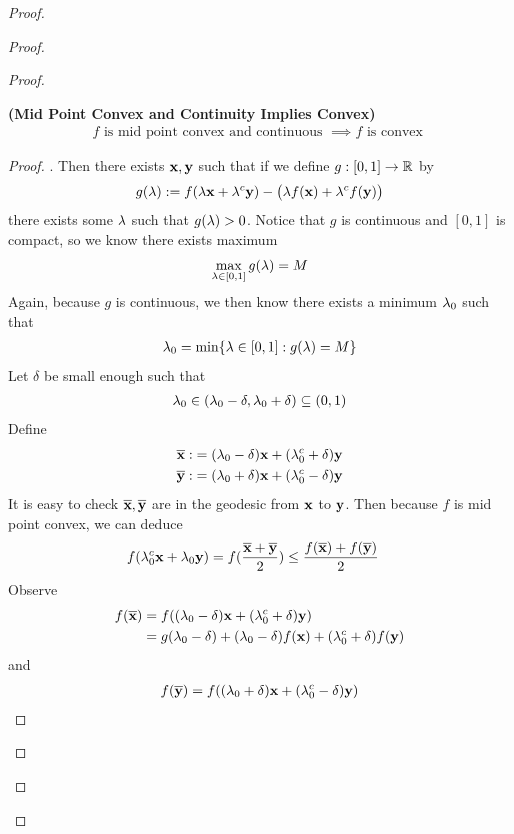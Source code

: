 \documentclass{report}
\begin{document}
\begin{proof}
\begin{proof}
\begin{proof}
\begin{theorem}
\label{5.2.7}
\textbf{(Mid Point Convex and Continuity Implies Convex)} 
\begin{align*}
f\text{ is mid point convex and continuous }\implies f\text{ is convex }
\end{align*}
\end{theorem}
\begin{proof}
. Then there exists $\textbf{x},\textbf{y}$ such that if we define $g:[0,1]\rightarrow \mathbb{R}$ by 
\begin{align*}
g(\lambda ):=f(\lambda \textbf{x}+\lambda ^c \textbf{y})- \big(\lambda  f(\textbf{x})+\lambda ^c f(\textbf{y})\big)
\end{align*}
there exists some $\lambda$ such that $g(\lambda )>0$. Notice that $g$ is continuous and  $[0,1]$ is compact, so we know there exists maximum 
\begin{align*}
\max_{\lambda \in [0,1]} g(\lambda )=M
\end{align*}
Again, because $g$ is continuous, we then know there exists a minimum $\lambda_0$ such that 
\begin{align*}
\lambda_0 =\min \{ \lambda \in [0,1]:g(\lambda )=M \}
\end{align*}
Let $\delta$ be small enough such that 
\begin{align*}
\lambda _0 \in (\lambda _0-\delta,\lambda _0+\delta)\subseteq (0,1)
\end{align*}
Define 
\begin{align*}
  \overline{\textbf{x}}:&=(\lambda _0-\delta)\textbf{x}+ (\lambda _0^c+\delta)\textbf{y}\\
\overline{\textbf{y}}:&= (\lambda _0 +\delta)\textbf{x}+(\lambda _0^c-\delta)\textbf{y}
\end{align*}
It is easy to check $\overline{\textbf{x}},\overline{\textbf{y}}$ are in the geodesic from $\textbf{x}$ to $\textbf{y}$. Then because $f$ is mid point convex, we can deduce 
 \begin{align*}
f(\lambda_0 ^c \textbf{x}+\lambda_0 \textbf{y})&= f(\frac{\overline{\textbf{x}}+\overline{\textbf{y}}}{2})\leq \frac{f(\overline{\textbf{x}})+f(\overline{\textbf{y}})}{2}
\end{align*}
Observe 
\begin{align*}
f(\overline{\textbf{x}})&=f((\lambda _0-\delta)\textbf{x}+(\lambda _0^c +\delta)\textbf{y})\\
&=g(\lambda_0-\delta)+(\lambda _0-\delta) f(\textbf{x})+(\lambda _0^c+\delta) f(\textbf{y})
\end{align*}
and 
\begin{align*}
f(\overline{\vecta{y}})&=f((\ld _0+\delta) \vecta{x}+(\ld _0^c-\delta)\vecta{y})\\

\end{align*}
\end{proof}
\end{proof}
\end{proof}
\end{proof}
\end{document}
